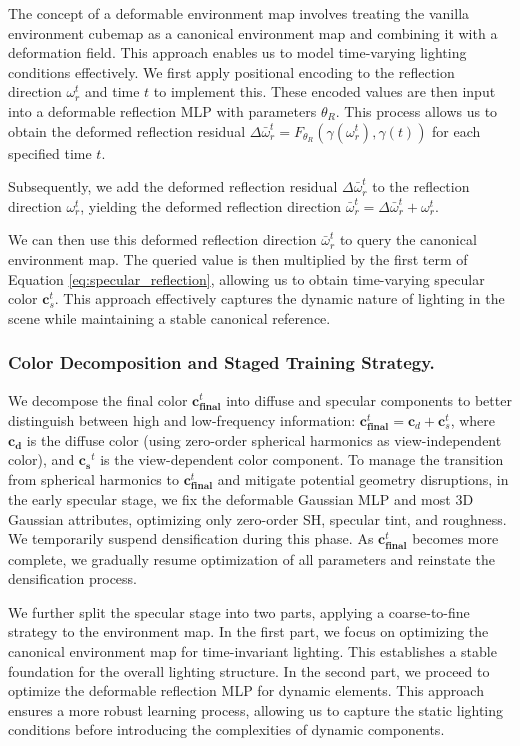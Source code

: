 The concept of a deformable environment map involves treating the vanilla environment cubemap as a canonical environment map and combining it with a deformation field. This approach enables us to model time-varying lighting conditions effectively. We first apply positional encoding to the reflection direction $\omega^t_r$ and time $t$ to implement this. These encoded values are then input into a deformable reflection MLP with parameters $\theta_{\textit{R}}$. This process allows us to obtain the deformed reflection residual $\Delta\bar\omega^t_r=F_{\theta_{\textit{R}}}(\gamma(\omega^t_r),\gamma(t))$ for each specified time $t$.

Subsequently, we add the deformed reflection residual $\Delta\bar\omega^t_r$ to the reflection direction $\omega^t_r$, yielding the deformed reflection direction $\bar\omega^t_r=\Delta\bar\omega^t_r + \omega^t_r$.

We can then use this deformed reflection direction $\bar\omega^t_r$ to query the canonical environment map. The queried value is then multiplied by the first term of Equation \ref{eq:specular_reflection}, allowing us to obtain time-varying specular color $\mathbf{c}_s^t$. This approach effectively captures the dynamic nature of lighting in the scene while maintaining a stable canonical reference.


\subsubsection{Color Decomposition and Staged Training Strategy.}

We decompose the final color $\mathbf{c}_\mathbf{final}^t$ into diffuse and specular components to better distinguish between high and low-frequency information: $\mathbf{c}_\mathbf{final}^t = \mathbf{c}_d + \mathbf{c}_s^t$,
where $\mathbf{c_d}$ is the diffuse color (using zero-order spherical harmonics as view-independent color), and $\mathbf{c_s}^t$ is the view-dependent color component.
To manage the transition from spherical harmonics to $\mathbf{c}_\mathbf{final}^t$ and mitigate potential geometry disruptions, in the early specular stage, we fix the deformable Gaussian MLP and most 3D Gaussian attributes, optimizing only zero-order SH, specular tint, and roughness. We temporarily suspend densification during this phase. As $\mathbf{c}_\mathbf{final}^t$ becomes more complete, we gradually resume optimization of all parameters and reinstate the densification process.

We further split the specular stage into two parts, applying a coarse-to-fine strategy to the environment map. In the first part, we focus on optimizing the canonical environment map for time-invariant lighting. This establishes a stable foundation for the overall lighting structure. In the second part, we proceed to optimize the deformable reflection MLP for dynamic elements. This approach ensures a more robust learning process, allowing us to capture the static lighting conditions before introducing the complexities of dynamic components.




